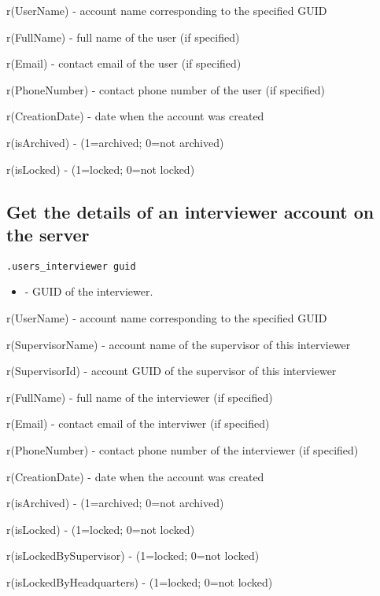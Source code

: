 \savedres
\begin{compactitem}
    \item r(UserName) - account name corresponding to the specified GUID
    \item r(FullName) - full name of the user (if specified)
    \item r(Email) - contact email of the user (if specified)
    \item r(PhoneNumber) - contact phone number of the user (if specified)
    \item r(CreationDate) - date when the account was created
    \item r(isArchived) - (1=archived; 0=not archived)
    \item r(isLocked) - (1=locked; 0=not locked)
\end{compactitem}


\subsection{Get the details of an interviewer account on the server}
\begin{lstlisting}[style=CommandLineStyle]
.users_interviewer guid
\end{lstlisting}

\paramsheader
\begin{itemize}
\item {} - GUID of the interviewer.
\end{itemize}

\savedres
\begin{compactitem}
    \item r(UserName) - account name corresponding to the specified GUID
    \item r(SupervisorName) - account name of the supervisor of this interviewer
    \item r(SupervisorId) - account GUID of the supervisor of this interviewer
    \item r(FullName) - full name of the interviewer (if specified)
    \item r(Email) - contact email of the interviwer (if specified)
    \item r(PhoneNumber) - contact phone number of the interviewer (if specified)
    \item r(CreationDate) - date when the account was created
    \item r(isArchived) - (1=archived; 0=not archived)
    \item r(isLocked) - (1=locked; 0=not locked)
    \item r(isLockedBySupervisor) - (1=locked; 0=not locked)
    \item r(isLockedByHeadquarters) - (1=locked; 0=not locked)
\end{compactitem}

